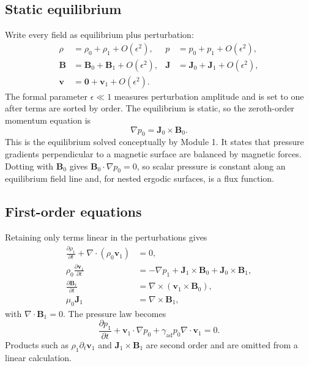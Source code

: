 \subsection{Static equilibrium}
Write every field as equilibrium plus perturbation:
\begin{align}
\rho&=\rho_0+\rho_1+O(\epsilon^2),&
 p&=p_0+p_1+O(\epsilon^2),\\
\mathbf B&=\mathbf B_0+\mathbf B_1+O(\epsilon^2),&
\mathbf J&=\mathbf J_0+\mathbf J_1+O(\epsilon^2),\\
\mathbf v&=\mathbf 0+\mathbf v_1+O(\epsilon^2).
\end{align}
The formal parameter $\epsilon\ll1$ measures perturbation amplitude and is set to one after terms are sorted by order. The equilibrium is static, so the zeroth-order momentum equation is
\begin{equation}
\boxed{\nabla p_0=\mathbf J_0\times\mathbf B_0.}
\label{eq:equilibrium_force_balance_mod4}
\end{equation}
This is the equilibrium solved conceptually by Module 1. It states that pressure gradients perpendicular to a magnetic surface are balanced by magnetic forces. Dotting with $\mathbf B_0$ gives $\mathbf B_0\cdot\nabla p_0=0$, so scalar pressure is constant along an equilibrium field line and, for nested ergodic surfaces, is a flux function.

\subsection{First-order equations}
Retaining only terms linear in the perturbations gives
\begin{align}
\frac{\partial\rho_1}{\partial t}+\nabla\cdot(\rho_0\mathbf v_1)&=0,
\label{eq:lin_continuity}\\
\rho_0\frac{\partial\mathbf v_1}{\partial t}
&=-\nabla p_1+\mathbf J_1\times\mathbf B_0+\mathbf J_0\times\mathbf B_1,
\label{eq:lin_momentum}\\
\frac{\partial\mathbf B_1}{\partial t}
&=\nabla\times(\mathbf v_1\times\mathbf B_0),
\label{eq:lin_induction}\\
\mu_0\mathbf J_1&=\nabla\times\mathbf B_1,
\label{eq:lin_ampere}
\end{align}
with $\nabla\cdot\mathbf B_1=0$. The pressure law becomes
\begin{equation}
\frac{\partial p_1}{\partial t}+\mathbf v_1\cdot\nabla p_0
+\gamma_{\mathrm{ad}}p_0\nabla\cdot\mathbf v_1=0.
\label{eq:lin_pressure}
\end{equation}
Products such as $\rho_1\partial_t\mathbf v_1$ and $\mathbf J_1\times\mathbf B_1$ are second order and are omitted from a linear calculation.

